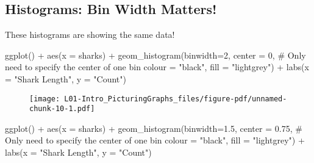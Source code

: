 \documentclass[
  letterpaper,
  DIV=11,
  numbers=noendperiod]{scrreprt}
\newenvironment{Shaded}{\begin{snugshade}}{\end{snugshade}}
\newcommand{\AttributeTok}[1]{\textcolor[rgb]{0.40,0.45,0.13}{#1}}
\newcommand{\CommentTok}[1]{\textcolor[rgb]{0.37,0.37,0.37}{#1}}
\newcommand{\DecValTok}[1]{\textcolor[rgb]{0.68,0.00,0.00}{#1}}
\newcommand{\FloatTok}[1]{\textcolor[rgb]{0.68,0.00,0.00}{#1}}
\newcommand{\FunctionTok}[1]{\textcolor[rgb]{0.28,0.35,0.67}{#1}}
\newcommand{\NormalTok}[1]{\textcolor[rgb]{0.00,0.23,0.31}{#1}}
\newcommand{\SpecialCharTok}[1]{\textcolor[rgb]{0.37,0.37,0.37}{#1}}
\newcommand{\StringTok}[1]{\textcolor[rgb]{0.13,0.47,0.30}{#1}}
\begin{document}
\hypertarget{histograms-bin-width-matters}{%
\subsection{Histograms: Bin Width
Matters!}\label{histograms-bin-width-matters}}

These histograms are showing the same data!

\begin{Shaded}
\begin{Highlighting}[]
\FunctionTok{ggplot}\NormalTok{() }\SpecialCharTok{+} 
    \FunctionTok{aes}\NormalTok{(}\AttributeTok{x =}\NormalTok{ sharks) }\SpecialCharTok{+}
    \FunctionTok{geom\_histogram}\NormalTok{(}\AttributeTok{binwidth=}\DecValTok{2}\NormalTok{, }
        \AttributeTok{center =} \DecValTok{0}\NormalTok{, }\CommentTok{\# Only need to specify the center of one bin}
        \AttributeTok{colour =} \StringTok{"black"}\NormalTok{, }\AttributeTok{fill =} \StringTok{"lightgrey"}\NormalTok{) }\SpecialCharTok{+}
    \FunctionTok{labs}\NormalTok{(}\AttributeTok{x =} \StringTok{"Shark Length"}\NormalTok{, }\AttributeTok{y =} \StringTok{"Count"}\NormalTok{)}
\end{Highlighting}
\end{Shaded}

\begin{figure}[H]

{\centering \texttt{[image: L01-Intro\_PicturingGraphs\_files/figure-pdf/unnamed-chunk-10-1.pdf]}

}

\end{figure}

\begin{Shaded}
\begin{Highlighting}[]
\FunctionTok{ggplot}\NormalTok{() }\SpecialCharTok{+} 
    \FunctionTok{aes}\NormalTok{(}\AttributeTok{x =}\NormalTok{ sharks) }\SpecialCharTok{+}
    \FunctionTok{geom\_histogram}\NormalTok{(}\AttributeTok{binwidth=}\FloatTok{1.5}\NormalTok{, }
        \AttributeTok{center =} \FloatTok{0.75}\NormalTok{, }\CommentTok{\# Only need to specify the center of one bin}
        \AttributeTok{colour =} \StringTok{"black"}\NormalTok{, }\AttributeTok{fill =} \StringTok{"lightgrey"}\NormalTok{) }\SpecialCharTok{+}
    \FunctionTok{labs}\NormalTok{(}\AttributeTok{x =} \StringTok{"Shark Length"}\NormalTok{, }\AttributeTok{y =} \StringTok{"Count"}\NormalTok{)}
\end{Highlighting}
\end{Shaded}
\end{document}
